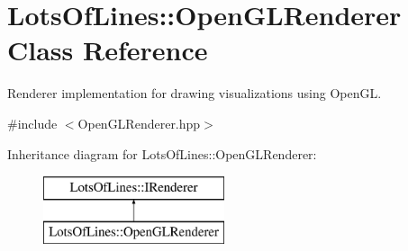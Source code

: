 \hypertarget{class_lots_of_lines_1_1_open_g_l_renderer}{}\section{Lots\+Of\+Lines\+:\+:Open\+G\+L\+Renderer Class Reference}
\label{class_lots_of_lines_1_1_open_g_l_renderer}


Renderer implementation for drawing visualizations using Open\+GL.  




{\ttfamily \#include $<$Open\+G\+L\+Renderer.\+hpp$>$}

Inheritance diagram for Lots\+Of\+Lines\+:\+:Open\+G\+L\+Renderer\+:\begin{figure}[H]
\begin{center}
\leavevmode
\includegraphics[height=2.000000cm]{class_lots_of_lines_1_1_open_g_l_renderer}
\end{center}
\end{figure}
